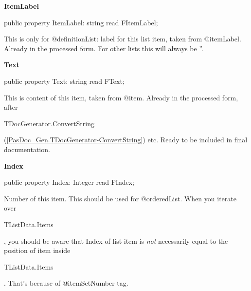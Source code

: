 \documentclass{report}
\newif\ifpdf
\begin{document}
\begin{list}{}{
\setlength{\itemindent}{0cm}
\setlength{\listparindent}{0cm}
\setlength{\leftmargin}{\evensidemargin}
\addtolength{\leftmargin}{\tmplength}
\settowidth{\labelsep}{X}
\addtolength{\leftmargin}{\labelsep}
\setlength{\labelwidth}{\tmplength}
}
\label{PasDoc_Gen.TListItemData-ItemLabel}
\item[\textbf{ItemLabel}\hfill]
\ifpdf
\begin{flushleft}
\fi
\begin{ttfamily}
public property ItemLabel: string read FItemLabel;\end{ttfamily}

\ifpdf
\end{flushleft}
\fi


\par This is only for @definitionList: label for this list item, taken from @itemLabel. Already in the processed form. For other lists this will always be ''.\label{PasDoc_Gen.TListItemData-Text}
\item[\textbf{Text}\hfill]
\ifpdf
\begin{flushleft}
\fi
\begin{ttfamily}
public property Text: string read FText;\end{ttfamily}

\ifpdf
\end{flushleft}
\fi


\par This is content of this item, taken from @item. Already in the processed form, after \begin{ttfamily}TDocGenerator.ConvertString\end{ttfamily}(\ref{PasDoc_Gen.TDocGenerator-ConvertString}) etc. Ready to be included in final documentation.\label{PasDoc_Gen.TListItemData-Index}
\item[\textbf{Index}\hfill]
\ifpdf
\begin{flushleft}
\fi
\begin{ttfamily}
public property Index: Integer read FIndex;\end{ttfamily}

\ifpdf
\end{flushleft}
\fi


\par Number of this item. This should be used for @orderedList. When you iterate over \begin{ttfamily}TListData.Items\end{ttfamily}, you should be aware that Index of list item is \textit{not} necessarily equal to the position of item inside \begin{ttfamily}TListData.Items\end{ttfamily}. That's because of @itemSetNumber tag.


\end{list}
\end{document}
